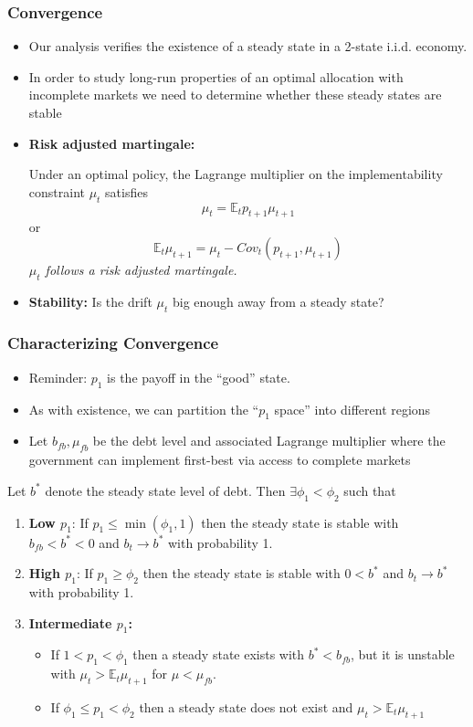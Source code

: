 \documentclass{beamer}
\newcommand{\EE}{\mathbb E}
\begin{document}
 \begin{frame}
  \frametitle{Convergence}
  \begin{itemize}
		\item Our analysis verifies the existence of a steady state in a 2-state i.i.d. economy.
		\item In order to study long-run properties of an optimal allocation with incomplete markets we need to determine whether these steady states are stable
		\item \textbf{Risk adjusted martingale:}
		
		Under an optimal policy, the Lagrange multiplier on the implementability  constraint $\mu_t$  satisfies
		\[
			\mu_t = \EE_t p_{t+1} \mu_{t+1}
		\] or
		\[
		\EE_t  \mu_{t+1}	= \mu_t -Cov_t (p_{t+1}, \mu_{t+1})
		\]
			\emph{$\mu_t$ follows a risk adjusted martingale.}
	
		\item \textbf{Stability: } Is the drift  $\mu_t$ big enough  away from a steady state?
		\end{itemize}
	
 \end{frame}



 \begin{frame}
  \frametitle{Characterizing Convergence}

  \begin{itemize}
  \item Reminder:  $p_1$ is the payoff in the ``good'' state.
   \item As with existence, we can partition  the ``$p_1$ space'' into different regions
   \item Let $b_{fb},\mu_{fb}$ be the debt level and associated Lagrange multiplier where the government can implement first-best via  access to complete markets
  \end{itemize}
  \small
 	\begin{theorem}
Let $b^*$ denote the steady state level of debt.  Then $\exists  \phi_1 < \phi_2$ such that
		\begin{enumerate}
			\item  \textbf{Low $p_1$}: If $p_1\leq\min(\phi_1,1)$ then the steady state is stable with $b_{fb}<b^*<0$ and $b_t\rightarrow b^*$ with probability 1.
			\item \textbf{High  $p_1$}:  If $p_1 \geq \phi_2$ then the steady state is stable with $0<b^*$ and $b_t \rightarrow b^*$ with probability 1.
			\item \textbf{Intermediate $p_1$:}
			\begin{itemize}
			  \item  If $1 < p_1 <\phi_1$ then a steady state exists with $b^* < b_{fb}$, but it is unstable with $\mu_t >\EE_t \mu_{t+1}$ for $\mu < \mu_{fb}$.
			\item  If $\phi_1\leq p_1<\phi_2$ then a steady state does not exist and $\mu_t > \EE_t\mu_{t+1}$
			\end{itemize}
		
		\end{enumerate}
	\end{theorem}
 \end{frame}
\end{document}
